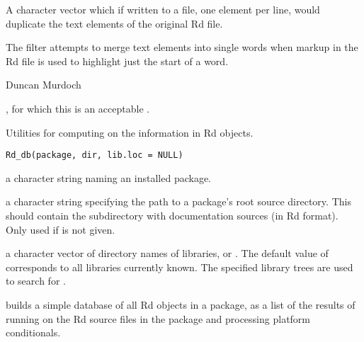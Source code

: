%
\begin{Value}
A character vector which if written to a file, one element per line, would 
duplicate the text elements of the original Rd file.
\end{Value}
%
\begin{Note}\relax
The filter attempts to merge text elements into single words when markup in
the Rd file is used to highlight just the start of a word.
\end{Note}
%
\begin{Author}\relax
Duncan Murdoch
\end{Author}
%
\begin{SeeAlso}\relax
{}, for which this is an acceptable .
\end{SeeAlso}
%
\begin{Description}\relax
Utilities for computing on the information in Rd objects.
\end{Description}
%
\begin{Usage}
\begin{verbatim}
Rd_db(package, dir, lib.loc = NULL)
\end{verbatim}
\end{Usage}
%
\begin{Arguments}
\begin{ldescription}
\item[\code{package}] a character string naming an installed package.
\item[\code{dir}] a character string specifying the path to a package's root
source directory.  This should contain the subdirectory 
with \R{} documentation sources (in Rd format).  Only used if
 is not given.
\item[\code{lib.loc}] a character vector of directory names of \R{} libraries,
or .  The default value of  corresponds to all
libraries currently known.  The specified library trees are used to
search for .
\end{ldescription}
\end{Arguments}
%
\begin{Details}\relax
{} builds a simple database of all Rd objects in a package,
as a list of the results of running  on the Rd
source files in the package and processing platform conditionals.
\end{Details}
